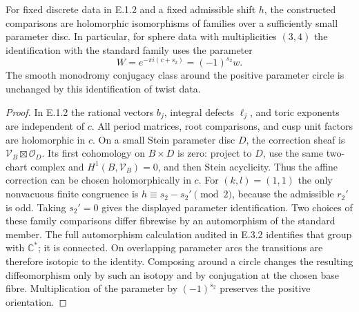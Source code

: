 \begin{corollary}
For fixed discrete data in E.1.2 and a fixed admissible shift $h$,
the constructed comparisons are holomorphic isomorphisms of families
over a sufficiently small parameter disc.  In particular, for sphere
data with multiplicities $(3,4)$ the identification with the standard
family uses the parameter
\[
 W=e^{-\pi i(c+s_2)}=(-1)^{s_2}w.
\]
The smooth monodromy conjugacy class around the positive parameter
circle is unchanged by this identification of twist data.
\end{corollary}
\begin{proof}
In E.1.2 the rational vectors $b_j$, integral defects $\ell_j$,
and toric exponents are independent of $c$.  All period matrices,
root comparisons, and cusp unit factors are holomorphic in $c$.
On a small Stein parameter disc $D$, the correction sheaf is
$\mathcal V_B\boxtimes\mathcal O_D$.  Its first cohomology on
$B\times D$ is zero: project to $D$, use the same two-chart
complex and $H^1(B,\mathcal V_B)=0$, and then Stein acyclicity.
Thus the affine correction can be chosen holomorphically in $c$.
For $(k,l)=(1,1)$ the only nonvacuous finite congruence is
$h\equiv s_2-s_2'\pmod2$, because the admissible $r_2'$ is odd.
Taking $s_2'=0$ gives the displayed parameter identification.
Two choices of these family comparisons differ fibrewise by an
automorphism of the standard member.  The full automorphism
calculation audited in E.3.2 identifies that group with $\mathbb C^*$;
it is connected.  On overlapping parameter arcs the transitions
are therefore isotopic to the identity.  Composing around a circle
changes the resulting diffeomorphism only by such an isotopy and
by conjugation at the chosen base fibre.  Multiplication of the
parameter by $(-1)^{s_2}$ preserves the positive orientation.
\end{proof}


